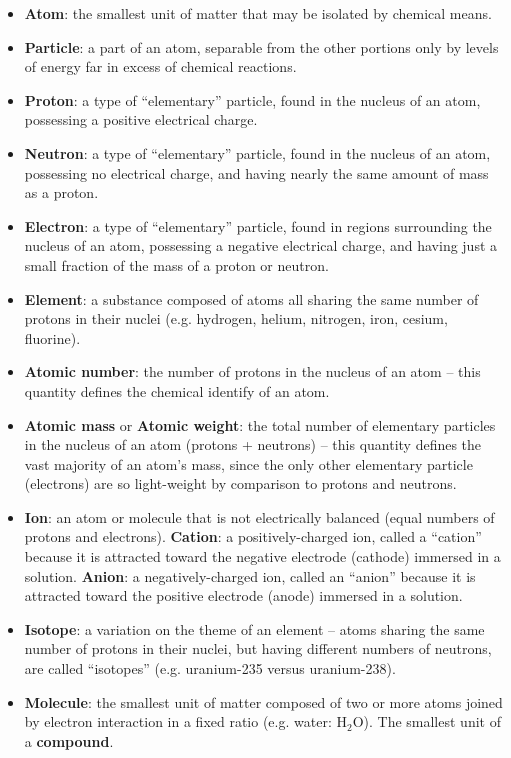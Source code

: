 \begin{itemize}
\item{} {\bf Atom}: the smallest unit of matter that may be isolated by chemical means.
\item{} {\bf Particle}: a part of an atom, separable from the other portions only by levels of energy far in excess of chemical reactions.
\item{} {\bf Proton}: a type of ``elementary'' particle, found in the nucleus of an atom, possessing a positive electrical charge.
\item{} {\bf Neutron}: a type of ``elementary'' particle, found in the nucleus of an atom, possessing no electrical charge, and having nearly the same amount of mass as a proton.
\item{} {\bf Electron}: a type of ``elementary'' particle, found in regions surrounding the nucleus of an atom, possessing a negative electrical charge, and having just a small fraction of the mass of a proton or neutron. 
\item{} {\bf Element}: a substance composed of atoms all sharing the same number of protons in their nuclei (e.g. hydrogen, helium, nitrogen, iron, cesium, fluorine). 
\item{} {\bf Atomic number}: the number of protons in the nucleus of an atom -- this quantity defines the chemical identify of an atom.  
\item{} {\bf Atomic mass} or {\bf Atomic weight}: the total number of elementary particles in the nucleus of an atom (protons + neutrons) -- this quantity defines the vast majority of an atom's mass, since the only other elementary particle (electrons) are so light-weight by comparison to protons and neutrons.  
\item{} {\bf Ion}: an atom or molecule that is not electrically balanced (equal numbers of protons and electrons). 
\itemitem{} {\bf Cation}: a positively-charged ion, called a ``cation'' because it is attracted toward the negative electrode (cathode) immersed in a solution.  
\itemitem{} {\bf Anion}: a negatively-charged ion, called an ``anion'' because it is attracted toward the positive electrode (anode) immersed in a solution.  
\item{} {\bf Isotope}: a variation on the theme of an element -- atoms sharing the same number of protons in their nuclei, but having different numbers of neutrons, are called ``isotopes'' (e.g. uranium-235 versus uranium-238).  
\item{} {\bf Molecule}: the smallest unit of matter composed of two or more atoms joined by electron interaction in a fixed ratio (e.g. water: H$_{2}$O).  The smallest unit of a {\bf compound}.  

\end{itemize}
